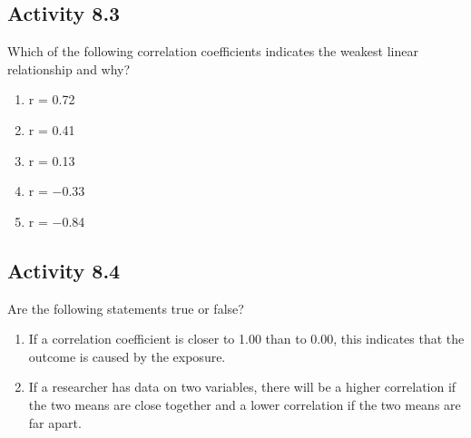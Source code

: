 \documentclass[
]{memoir}
\providecommand{\tightlist}{%
  \setlength{\itemsep}{0pt}\setlength{\parskip}{0pt}}
\begin{document}
\hypertarget{activity-8.3}{%
\subsection*{Activity 8.3}\label{activity-8.3}}

Which of the following correlation coefficients indicates the weakest linear relationship and why?

\begin{enumerate}
\def\labelenumi{\alph{enumi})}
\tightlist
\item
  r = 0.72
\item
  r = 0.41
\item
  r = 0.13
\item
  r = −0.33
\item
  r = −0.84
\end{enumerate}

\hypertarget{activity-8.4}{%
\subsection*{Activity 8.4}\label{activity-8.4}}

Are the following statements true or false?

\begin{enumerate}
\def\labelenumi{\alph{enumi})}
\tightlist
\item
  If a correlation coefficient is closer to 1.00 than to 0.00, this indicates that the outcome is caused by the exposure.
\item
  If a researcher has data on two variables, there will be a higher correlation if the two means are close together and a lower correlation if the two means are far apart.
\end{enumerate}

  
\end{document}
